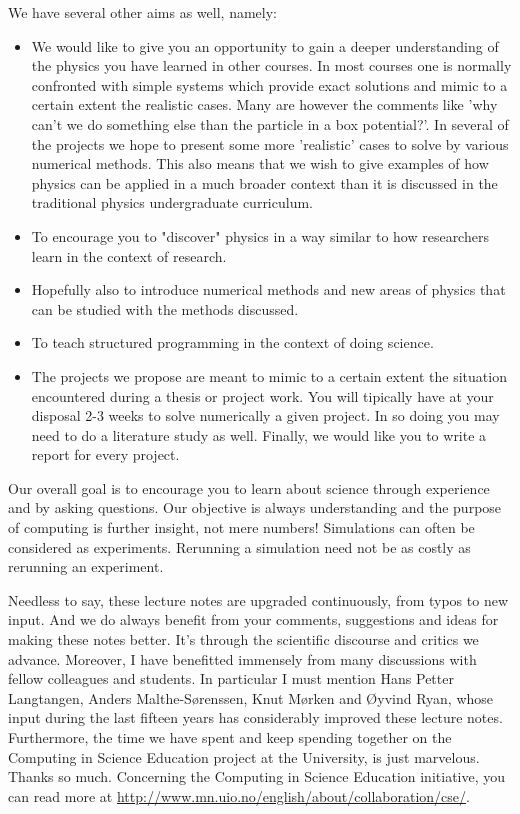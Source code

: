 We have several other aims as well, namely:
\begin{itemize}
\item We would like to give you  an opportunity to gain a 
      deeper understanding of the physics you have learned in other
      courses. In most courses one is normally confronted with simple
      systems which provide exact solutions and mimic to a certain
      extent the realistic cases. Many are however the comments like
      'why can't we do something else than the particle in a box
      potential?'.  In several of the projects we hope to present some
      more 'realistic' cases to solve by various numerical
      methods. This also means that we wish to give examples of how
      physics can be applied in a much broader context than it is
      discussed in the traditional physics undergraduate curriculum.
\item To encourage you to "discover" physics in a way similar to how 
researchers learn in the context of research.
\item Hopefully also to introduce numerical methods and new areas of physics that 
      can be studied with the methods discussed.
\item To teach   structured programming in the context of doing science. 
\item The projects we propose are meant to mimic to a certain extent 
      the situation encountered during a thesis or project work. You
      will tipically have at your disposal 2-3 weeks to solve
      numerically a given project. In so doing you may need to do a
      literature study as well. Finally, we would like you to write a
      report for every project.
\end{itemize}
Our overall goal is to encourage you to learn about science through
experience and by asking questions. Our objective is always
understanding and the purpose of computing is further insight, not
mere numbers!  Simulations can often be considered as
experiments. Rerunning a simulation need not be as costly as rerunning
an experiment.


 
Needless to say, these lecture notes are upgraded continuously, from
typos to new input.  And we do always benefit from your comments,
suggestions and ideas for making these notes better.  It's through the
scientific discourse and critics we advance.  Moreover, I have
benefitted immensely from many discussions with fellow colleagues and
students. In particular I must mention Hans Petter Langtangen, Anders
Malthe-S\o renssen, Knut M\o rken and \O yvind Ryan, whose input
during the last fifteen years has considerably improved these lecture
notes.  Furthermore, the time we have spent and keep spending together
on the Computing in Science Education project at the University, is
just marvelous. Thanks so much. Concerning the Computing in Science
Education initiative, you can read more
at \url{http://www.mn.uio.no/english/about/collaboration/cse/}.


